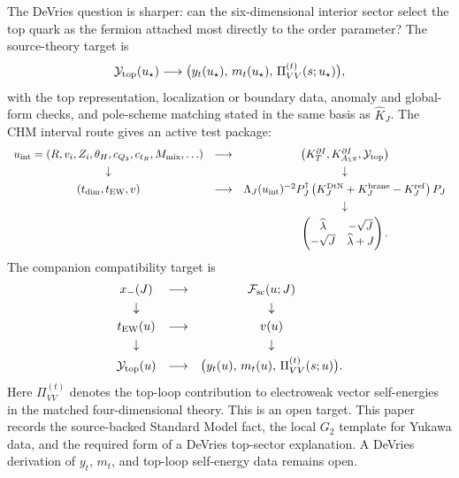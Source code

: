 The DeVries question is sharper: can the six-dimensional interior sector
select the top quark as the fermion attached most directly to the order
parameter?  The source-theory target is
\begin{equation}
  \mathcal Y_{\rm top}(u_\star)
  \longrightarrow
  \big(y_t(u_\star),\,m_t(u_\star),\,\Pi^{(t)}_{VV}(s;u_\star)\big),
  \label{eq:top-sector-map}
\end{equation}
with the top representation, localization or boundary data, anomaly and
global-form checks, and pole-scheme matching stated in the same basis as
\(\widehat K_J\).  The CHM interval route gives an active test package:
\begin{equation}
\begin{array}{ccc}
u_{\rm int}=(R,v_i,Z_i,\theta_H,c_{Q_3},c_{t_R},M_{\rm mix},\ldots)
&\longrightarrow&
\left(K_T^{\partial I},K_{A_5\pi}^{\partial I},
\mathcal Y_{\rm top}\right)
\\[3pt]
\downarrow && \downarrow
\\[3pt]
(t_{\rm dim},t_{\rm EW},v)
&\longrightarrow&
\Lambda_J(u_{\rm int})^{-2}
P_J^\dagger
\left(K^{\rm DtN}_J+K^{\rm brane}_J-K^{\rm ref}_J\right)P_J
\\[3pt]
&& \downarrow
\\[3pt]
&&
\begin{pmatrix}
\widehat\lambda&-\sqrt J\\
-\sqrt J&\widehat\lambda+J
\end{pmatrix}.
\end{array}
\label{eq:chm-o10-top-source-test}
\end{equation}
The companion compatibility target is
\begin{equation}
\begin{array}{ccc}
x_-(J) &\longrightarrow& \mathcal F_{\rm sc}(u;J)
\\[3pt]
\downarrow && \downarrow
\\[3pt]
t_{\rm EW}(u) &\longrightarrow& v(u)
\\[3pt]
\downarrow && \downarrow
\\[3pt]
\mathcal Y_{\rm top}(u)
&\longrightarrow&
\big(y_t(u),\,m_t(u),\,\Pi^{(t)}_{VV}(s;u)\big).
\end{array}
\label{eq:top-sector-compatibility}
\end{equation}
Here \(\Pi^{(t)}_{VV}\) denotes the top-loop contribution to electroweak vector
self-energies in the matched four-dimensional theory.  This is an open target.
This paper records the source-backed Standard Model fact, the local
\(G_2\) template for Yukawa data, and the required form of a DeVries
top-sector explanation.  A DeVries derivation of \(y_t\), \(m_t\), and
top-loop self-energy data remains open.
